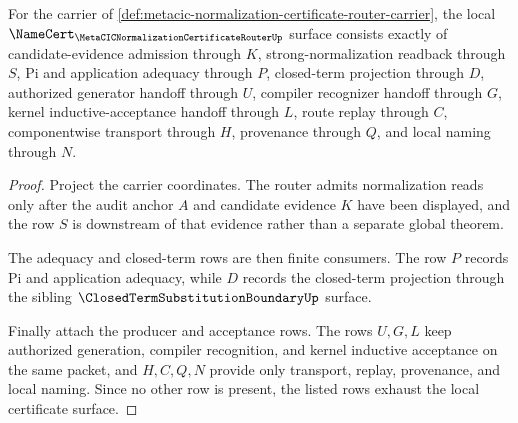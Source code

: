 \begin{theorem}
\label{thm:metacic-normalization-certificate-router-obligation-surface}
For the carrier of \autoref{def:metacic-normalization-certificate-router-carrier}, the local $\NameCert_{\MetaCICNormalizationCertificateRouterUp}$ surface consists exactly of candidate-evidence admission through $K$, strong-normalization readback through $S$, Pi and application adequacy through $P$, closed-term projection through $D$, authorized generator handoff through $U$, compiler recognizer handoff through $G$, kernel inductive-acceptance handoff through $L$, route replay through $C$, componentwise transport through $H$, provenance through $Q$, and local naming through $N$.
\end{theorem}
\begin{proof}
Project the carrier coordinates. The router admits normalization reads only after the audit anchor $A$ and candidate evidence $K$ have been displayed, and the row $S$ is downstream of that evidence rather than a separate global theorem.

The adequacy and closed-term rows are then finite consumers. The row $P$ records Pi and application adequacy, while $D$ records the closed-term projection through the sibling $\ClosedTermSubstitutionBoundaryUp$ surface.

Finally attach the producer and acceptance rows. The rows $U,G,L$ keep authorized generation, compiler recognition, and kernel inductive acceptance on the same packet, and $H,C,Q,N$ provide only transport, replay, provenance, and local naming. Since no other row is present, the listed rows exhaust the local certificate surface.
\end{proof}

